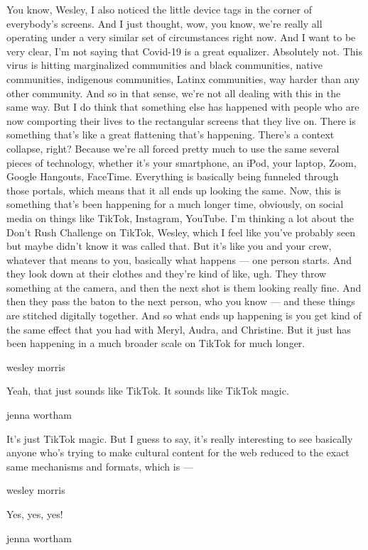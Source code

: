 You know, Wesley, I also noticed the little device tags in the corner of
everybody's screens. And I just thought, wow, you know, we're really all
operating under a very similar set of circumstances right now. And I
want to be very clear, I'm not saying that Covid-19 is a great
equalizer. Absolutely not. This virus is hitting marginalized
communities and black communities, native communities, indigenous
communities, Latinx communities, way harder than any other community.
And so in that sense, we're not all dealing with this in the same way.
But I do think that something else has happened with people who are now
comporting their lives to the rectangular screens that they live on.
There is something that's like a great flattening that's happening.
There's a context collapse, right? Because we're all forced pretty much
to use the same several pieces of technology, whether it's your
smartphone, an iPod, your laptop, Zoom, Google Hangouts, FaceTime.
Everything is basically being funneled through those portals, which
means that it all ends up looking the same. Now, this is something
that's been happening for a much longer time, obviously, on social media
on things like TikTok, Instagram, YouTube. I'm thinking a lot about the
Don't Rush Challenge on TikTok, Wesley, which I feel like you've
probably seen but maybe didn't know it was called that. But it's like
you and your crew, whatever that means to you, basically what happens
--- one person starts. And they look down at their clothes and they're
kind of like, ugh. They throw something at the camera, and then the next
shot is them looking really fine. And then they pass the baton to the
next person, who you know --- and these things are stitched digitally
together. And so what ends up happening is you get kind of the same
effect that you had with Meryl, Audra, and Christine. But it just has
been happening in a much broader scale on TikTok for much longer.

wesley morris

Yeah, that just sounds like TikTok. It sounds like TikTok magic.

jenna wortham

It's just TikTok magic. But I guess to say, it's really interesting to
see basically anyone who's trying to make cultural content for the web
reduced to the exact same mechanisms and formats, which is ---

wesley morris

Yes, yes, yes!

jenna wortham


